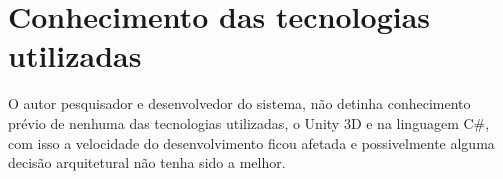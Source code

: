 \section{Conhecimento das tecnologias utilizadas}\label{pro:conhecimento}
  O autor pesquisador e desenvolvedor do sistema, não detinha conhecimento prévio de nenhuma das
tecnologias utilizadas, o Unity 3D e na linguagem C\#, com isso a velocidade do desenvolvimento ficou afetada
e possivelmente alguma decisão arquitetural não tenha sido a melhor.
